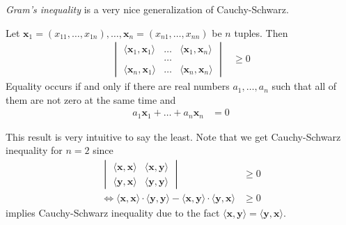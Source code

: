 \documentclass{subfile}
\begin{document}
	\emph{Gram's inequality} is a very nice generalization of Cauchy-Schwarz.
		\begin{theorem}
			Let $\mathbf{x}_1=(x_{11},\ldots,x_{1n}),\ldots,\mathbf{x}_n=(x_{n1},\ldots,x_{nn})$ be $n$ tuples. Then
				\begin{align*}
					\begin{vmatrix}
						\langle \mathbf{x}_{1},\mathbf{x}_{1}\rangle & \ldots & \langle \mathbf{x}_{1},\mathbf{x}_{n}\rangle\\
						& \ldots & \\
						\langle \mathbf{x}_{n},\mathbf{x}_{1}\rangle & \ldots & \langle \mathbf{x}_{n},\mathbf{x}_{n}\rangle
					\end{vmatrix}
						& \geq0
				\end{align*}
			Equality occurs if and only if there are real numbers $a_1,\ldots,a_n$ such that all of them are not zero at the same time and
				\begin{align*}
					a_{1}\mathbf{x}_{1}+\ldots+a_{n}\mathbf{x}_{n}
						& = 0
				\end{align*}
		\end{theorem}
	This result is very intuitive to say the least. Note that we get Cauchy-Schwarz inequality for $n=2$ since
		\begin{align*}
			\begin{vmatrix}
				\langle\mathbf{x},\mathbf{x}\rangle & \langle\mathbf{x},\mathbf{y}\rangle\\
				\langle\mathbf{y},\mathbf{x}\rangle & \langle\mathbf{y},\mathbf{y}\rangle
			\end{vmatrix}
				& \geq0\\
			\iff\langle\mathbf{x},\mathbf{x}\rangle\cdot\langle\mathbf{y},\mathbf{y}\rangle-\langle\mathbf{x},\mathbf{y}\rangle\cdot\langle\mathbf{y},\mathbf{x}\rangle
				& \geq0
		\end{align*}
	implies Cauchy-Schwarz inequality due to the fact $\langle\mathbf{x},\mathbf{y}\rangle=\langle\mathbf{y},\mathbf{x}\rangle$.
\end{document}
